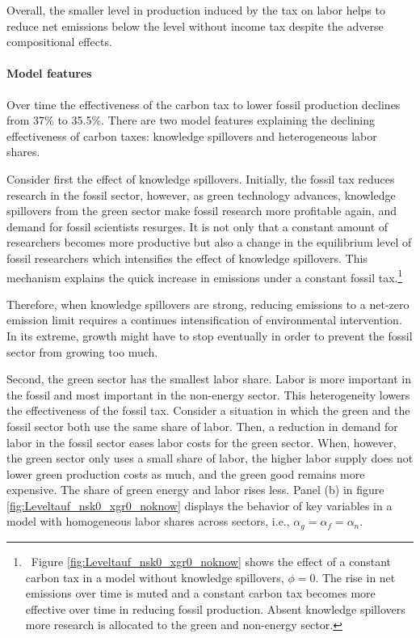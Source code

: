 Overall, the smaller level in production induced by the tax on labor helps to reduce net emissions below the level without income tax despite the adverse compositional effects.
 
 \paragraph{Model features}
 
 Over time the effectiveness of the carbon tax to lower fossil production declines from 37\% to 35.5\%. There are two model features explaining the declining effectiveness of carbon taxes: knowledge spillovers and heterogeneous labor shares. 
 
 Consider first the effect of knowledge spillovers.
  Initially, the fossil tax reduces research in the fossil sector, however, as green technology advances, knowledge spillovers from the green sector make fossil research more profitable again, and demand for fossil scientists resurges.
   It is not only that a constant amount of researchers becomes more productive but also a change in the equilibrium level of fossil researchers which intensifies the effect of knowledge spillovers. This mechanism explains the quick increase in emissions under a constant fossil tax.\footnote{\ Figure \ref{fig:Leveltauf_nsk0_xgr0_noknow} shows the effect of a constant carbon tax in a model without knowledge spillovers, $\phi=0$. The rise in net emissions over time is muted and a constant carbon tax becomes more effective over time in reducing fossil production.  Absent knowledge spillovers more research is allocated to the green and non-energy sector.} 
   
    Therefore, when knowledge spillovers are strong, reducing emissions to a net-zero emission limit requires a continues intensification of environmental intervention. In its extreme, growth might have to stop eventually in order to prevent the fossil sector from growing too much.
 
 Second, the green sector has the smallest labor share. Labor is more important in the fossil and most important in the non-energy sector. This heterogeneity lowers the effectiveness of the fossil tax. 
 Consider a situation in which the green and the fossil sector both use the same share of labor. Then, a reduction in demand for labor in the fossil sector eases labor costs for the green sector. When, however, the green sector only uses a small share of labor, the higher labor supply does not lower green production costs as much, and the green good remains more expensive. The share of green energy and labor rises less. Panel (b)  in figure \ref{fig:Leveltauf_nsk0_xgr0_noknow} displays the behavior of key variables in a model with homogeneous labor shares across sectors, i.e., $\alpha_g=\alpha_f=\alpha_n$. 

